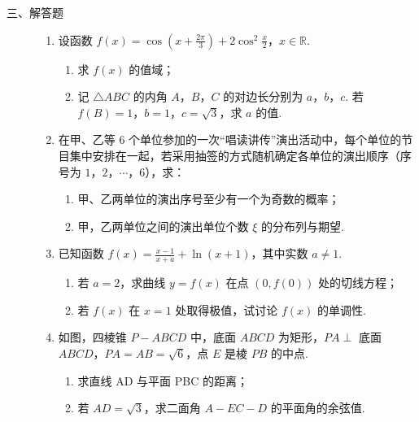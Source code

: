 \begin{description}

    \item[三、解答题]

    \begin{enumerate}[leftmargin=5pt]

      \addtocounter{enumi}{+15}

        \item 设函数 \(f(x) = \cos \left(x + \frac{2\pi}{3}\right) + 2\cos^2 \frac{x}{2}\)，\(x \in \mathbb{R}\).

\begin{enumerate}
\item 求 \( f(x) \) 的值域；
\item 记 \(\triangle ABC\) 的内角 \(A\)，\(B\)，\(C\) 的对边长分别为 \(a\)，\(b\)，\(c\). 若 \(f(B) = 1\)，\(b = 1\)，\(c = \sqrt{3}\)，求 \(a\) 的值.
\end{enumerate}

        \item 在甲、乙等 6 个单位参加的一次“唱读讲传”演出活动中，每个单位的节目集中安排在一起，若采用抽签的方式随机确定各单位的演出顺序（序号为 \(1\)，\(2\)，\(\cdots\)，\(6\)），求：

\begin{enumerate}
\item 甲、乙两单位的演出序号至少有一个为奇数的概率；
\item 甲，乙两单位之间的演出单位个数 \(\xi\) 的分布列与期望.
\end{enumerate}

        \item 已知函数 \( f(x) = \frac{x - 1}{x + a} + \ln\left(x + 1\right) \)，其中实数 \( a \neq 1 \).

\begin{enumerate}
\item 若 \(a = 2\)，求曲线 \(y = f(x)\) 在点 \((0, f(0))\) 处的切线方程；
\item 若 \( f(x) \) 在 \( x = 1 \) 处取得极值，试讨论 \( f(x) \) 的单调性.
\end{enumerate}

        \item 如图，四棱锥 \(P - ABCD\) 中，底面 \(ABCD\) 为矩形，\(PA \perp\) 底面 \(ABCD\)，\(PA = AB = \sqrt{6}\)，点 \(E\) 是棱 \(PB\) 的中点.

\begin{enumerate}
\item 求直线 AD 与平面 PBC 的距离；
\item 若 \(AD = \sqrt{3}\)，求二面角 \(A - EC - D\) 的平面角的余弦值.
\end{enumerate}


\end{enumerate}
\end{description}
